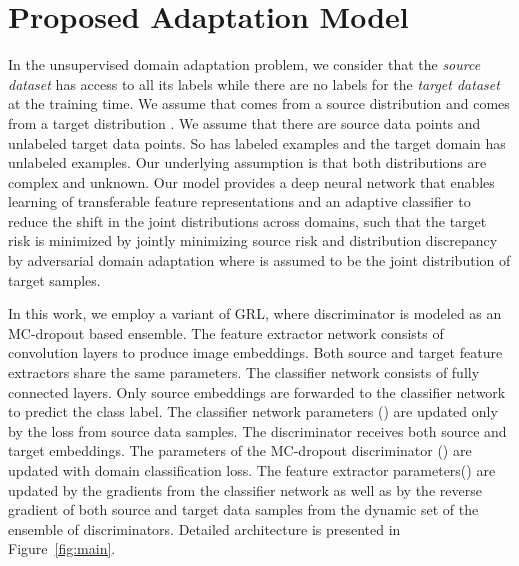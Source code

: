 \documentclass{bmvc2k}
\begin{document}
\section{Proposed Adaptation Model}
In the unsupervised domain adaptation problem, we consider that the \textit{source dataset}  has access to all its labels while there are no labels for the \textit{target dataset}  at the training time. We assume that  comes from a source distribution  and  comes from a target distribution . We assume that there are  source data points and  unlabeled target data points.
So  has  labeled examples and the target
domain   has  unlabeled examples.
Our underlying assumption is that both distributions are complex and unknown.
Our model provides a deep neural network that enables learning of transferable feature representations  and an adaptive  classifier  to reduce the
shift in the joint distributions across domains, such that the
target risk  is minimized by jointly
minimizing source risk and distribution discrepancy by adversarial 
domain adaptation where   is assumed to be the joint distribution of target samples.

In this work, we employ a variant of GRL\cite{ganin_ICML2015}, where discriminator is modeled as an MC-dropout based ensemble. The feature extractor network consists of convolution layers to produce image embeddings. Both source and target feature extractors share the same parameters. The classifier network consists of fully connected layers. Only source embeddings are forwarded to the classifier network to predict the class label. The classifier network parameters () are updated only by the loss from source data samples. The discriminator receives both source and target embeddings. The parameters of the MC-dropout discriminator () are updated with domain classification loss. The feature extractor parameters() are updated by the gradients from the classifier network as well as by the reverse gradient of both source and target data samples from the dynamic set of the ensemble of discriminators. Detailed architecture is presented in Figure~\ref{fig:main}.
\end{document}
